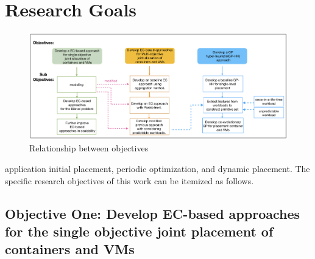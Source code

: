 \section{Research Goals}

\begin{figure}
	\centering
	\includegraphics[width=\textwidth]{pics/thesisPlan.png}
	\caption{Relationship between objectives}
	\label{fig:objectives}
\end{figure}
 application initial placement, periodic optimization, and dynamic placement. The specific research objectives of this work can be itemized as follows.

\subsection{Objective One: Develop EC-based approaches for the single objective joint placement of containers and VMs}
\label{sec:obj1}

